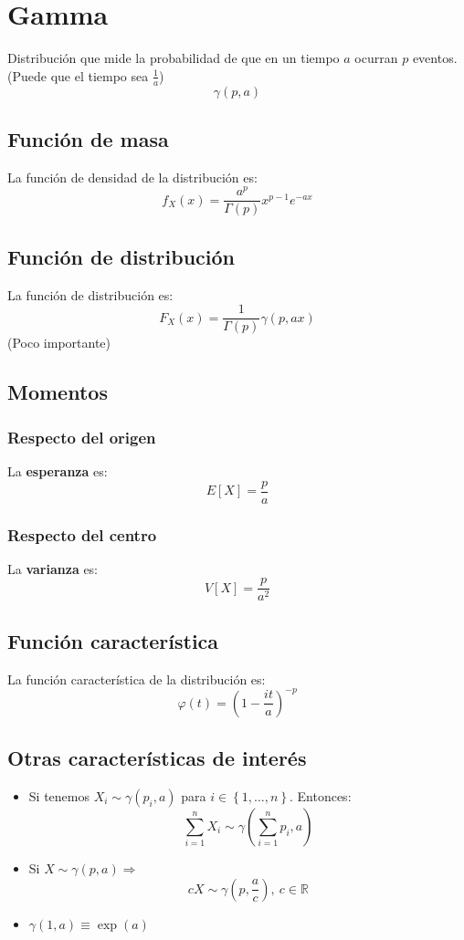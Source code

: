 \section{Gamma}
\label{sec:gamma}
Distribución que mide la probabilidad de que en un tiempo $a$ ocurran $p$ eventos. (Puede que el tiempo sea $\frac{1}{a}$)
\[
\boxed{\gamma\left( p, a \right)}
\]

\subsection{Función de masa}
La función de densidad de la distribución es:
\[
f_X \left( x \right) = \frac{a^p}{\Gamma\left( p \right)} x^{p - 1} e^{-ax}
\]

\subsection{Función de distribución}
La función de distribución es:
\[
F_X\left( x \right) = \frac{1}{\Gamma\left( p \right)} \gamma\left( p, ax \right)
\]
(Poco importante)

\subsection{Momentos}

\subsubsection*{Respecto del origen}
La \textbf{esperanza} es: 
\[
    E\left[ X \right] = \frac{p}{a}
\]
\subsubsection*{Respecto del centro}
La \textbf{varianza} es:
\[
    V\left[ X \right] = \frac{p}{a^2}
\]

\subsection{Función característica}
La función característica de la distribución es:
\[
\varphi\left( t \right) = \left( 1 - \frac{it}{a} \right)^{-p}
\]

\subsection{Otras características de interés}
\begin{itemize}
    \item Si tenemos $X_i \sim \gamma\left( p_i, a \right)$ para $i \in \left\{ 1, \ldots, n \right\}$. Entonces:
    \[
    \sum_{i=1}^{n} X_i \sim \gamma\left( \sum_{i=1}^{n} p_i, a \right) 
    \]
    \item Si $X \sim \gamma\left( p, a \right) \Rightarrow$
    \[
    c X \sim \gamma\left( p, \frac{a}{c} \right),\ c \in \mathbb{R}
    \]
    \item $\gamma\left( 1, a \right) \equiv \exp\left( a \right)$
\end{itemize}
